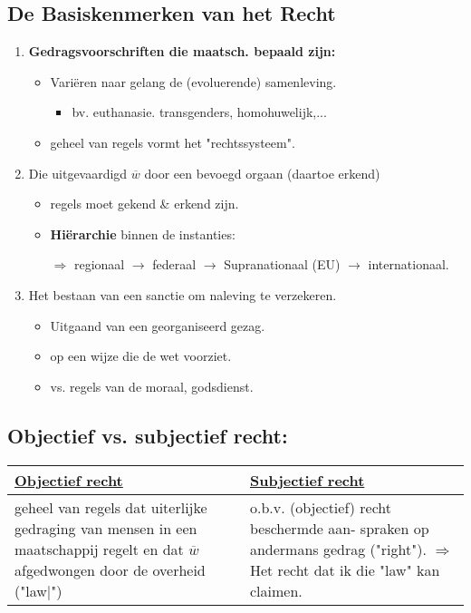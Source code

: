 \subsection*{De Basiskenmerken van het Recht}
\begin{enumerate}
	\item \textbf{Gedragsvoorschriften die maatsch. bepaald zijn:}
	\begin{itemize}
		\item Vari\"eren naar gelang de (evoluerende) samenleving.
		\begin{itemize}
			\item bv. euthanasie. transgenders, homohuwelijk,...
		\end{itemize}
		\item geheel van regels vormt het "rechtssysteem".
	\end{itemize}
	\item Die uitgevaardigd $\overline{w}$ door een bevoegd orgaan (daartoe erkend)
	\begin{itemize}
		\item regels moet gekend \& erkend zijn.
		\item \textbf{Hi\"erarchie} binnen de instanties:
		\item[$\Rightarrow$] regionaal $\rightarrow$ federaal  $\rightarrow$ Supranationaal (EU)  $\rightarrow$ internationaal.
		\end{itemize}
	\item Het bestaan van een sanctie om naleving te verzekeren.
	\begin{itemize}
		\item Uitgaand van een georganiseerd gezag.
		\item op een wijze die de wet voorziet.
		\item vs. regels van de moraal, godsdienst.
	\end{itemize}
\end{enumerate}

\subsection*{Objectief vs. subjectief recht:}

\begin{tabular}{|p{} | p{} |}
	\hline \textbf{\underline{Objectief recht}} & \textbf{\underline{Subjectief recht}} \\
	\hline geheel van regels dat uiterlijke gedraging van mensen in een maatschappij regelt en dat $\overline{w}$ afgedwongen door de overheid ("law|") & o.b.v. (objectief) recht beschermde aan- spraken op andermans gedrag ("right"). $\Rightarrow$ Het recht dat ik die "law" kan claimen.\\ \hline
\end{tabular}

